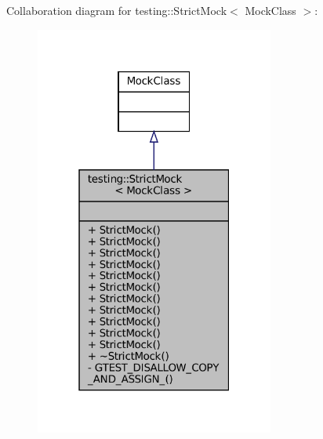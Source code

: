 Collaboration diagram for testing\+:\+:Strict\+Mock$<$ Mock\+Class $>$\+:
\nopagebreak
\begin{figure}[H]
\begin{center}
\leavevmode
\includegraphics[width=223pt]{classtesting_1_1StrictMock__coll__graph}
\end{center}
\end{figure}
